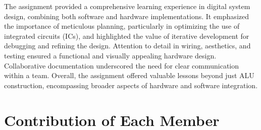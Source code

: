 \documentclass[11pt]{article}
\begin{document}
The assignment provided a comprehensive learning experience in digital system design, combining both software and hardware implementations. It emphasized the importance of meticulous planning, particularly in optimizing the use of integrated circuits (ICs), and highlighted the value of iterative development for debugging and refining the design. Attention to detail in wiring, aesthetics, and testing ensured a functional and visually appealing hardware design. Collaborative documentation underscored the need for clear communication within a team. Overall, the assignment offered valuable lessons beyond just ALU construction, encompassing broader aspects of hardware and software integration.
\section{Contribution of Each Member}
\end{document}
